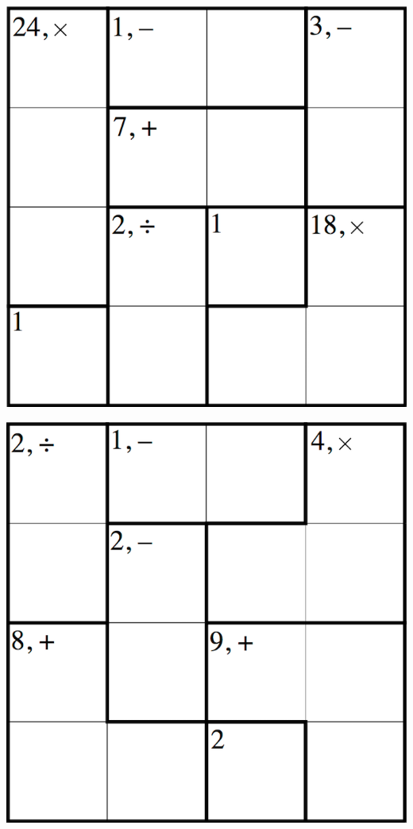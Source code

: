 
\includegraphics[scale=1]{Gambar/Lampiran/4x4_9.png}

\includegraphics[scale=1]{Gambar/Lampiran/4x4_10.png}
